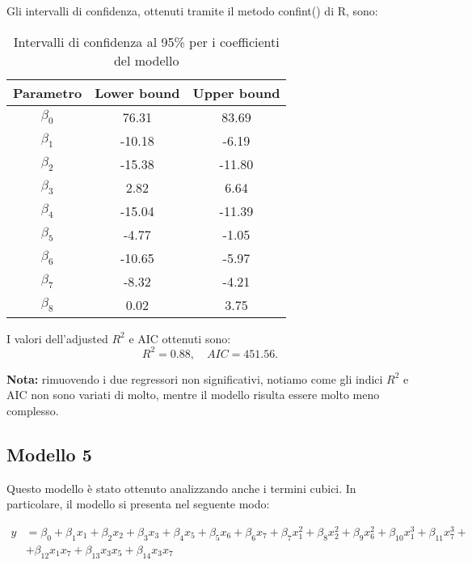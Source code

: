 Gli intervalli di confidenza, ottenuti tramite il metodo confint() di R, sono:
\begin{table}[H]
	\centering
	\begin{tabular}{|c|c|c|}
		\hline
		\textbf{Parametro} & \textbf{Lower bound} & \textbf{Upper bound} \\
		\hline
		$\beta_0$   & 76.31  & 83.69 \\
		$\beta_1$   & -10.18 & -6.19 \\
		$\beta_2$   & -15.38 & -11.80 \\
		$\beta_3$   & 2.82   & 6.64 \\
		$\beta_4$   & -15.04  & -11.39 \\
		$\beta_5$   & -4.77 & -1.05 \\
		$\beta_6$   & -10.65  & -5.97 \\
		$\beta_7$   & -8.32  & -4.21 \\
		$\beta_8$   & 0.02 & 3.75 \\
		\hline
	\end{tabular}
	\caption{Intervalli di confidenza al 95\% per i coefficienti del modello}
	\label{tab:ci_coefficienti}
\end{table}
I valori dell'adjusted $R^2$  e AIC ottenuti sono:
\begin{equation*}
	R^2 =      0.88, \quad AIC=451.56.
\end{equation*}

\textbf{Nota:} rimuovendo i due regressori non significativi, notiamo come gli indici $R^2$ e AIC non sono variati di molto, mentre il modello risulta essere molto meno complesso.

\subsection{Modello 5}
Questo modello è stato ottenuto analizzando anche i termini cubici. In particolare, il modello si presenta nel seguente modo:

\begin{align*}
	y &= \beta_0 + \beta_1x_1 + \beta_2x_2 + \beta_3x_3 + \beta_4x_5 + \beta_5x_6 + \beta_6x_7 + \beta_7x_1^2 + \beta_8x_2^2 + \beta_9x_6^2 + \beta_{10}x_1^3 + \beta_{11}x_7^3+ \\
	&+ \beta_{12}x_1x_7 + \beta_{13}x_3x_5 + \beta_{14}x_3x_7
\end{align*}

